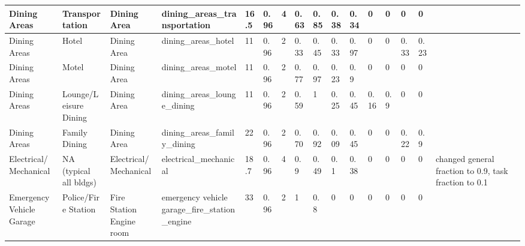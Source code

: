 \begin{center}
\begin{landscape}
\begin{longtable}{|p{0.75in}|p{0.75in}|p{0.75in}|p{0.75in}|p{0.3in}|p{0.3in}|p{0.3in}|p{0.3in}|p{0.3in}|p{0.3in}|p{0.3in}|p{0.3in}|p{0.3in}|p{0.3in}|p{0.3in}|p{0.6in}|}
      Dining Areas                            & Transportation              & Dining Area                                     & dining\_areas\_transportation                                   & 16.5 & 0.96 & 4  & 0.63   & 0.85  & 0.38  & 0.34  & 0    & 0    & 0    & 0    &                                                                                       \\ \hline
      Dining Areas                            & Hotel                       & Dining Area                                     & dining\_areas\_hotel                                            & 11   & 0.96 & 2  & 0.33   & 0.45  & 0.33  & 0.97  & 0    & 0    & 0.33 & 0.23 &                                                                                       \\ \hline
      Dining Areas                            & Motel                       & Dining Area                                     & dining\_areas\_motel                                            & 11   & 0.96 & 2  & 0.77   & 0.97  & 0.23  & 0.9   & 0    & 0    & 0    & 0    &                                                                                       \\ \hline
      Dining Areas                            & Lounge/Leisure Dining       & Dining Area                                     & dining\_areas\_lounge\_dining                                   & 11   & 0.96 & 2  & 0.59   & 1     & 0.25  & 0.45  & 0.16 & 0.9  & 0    & 0    &                                                                                       \\ \hline
      Dining Areas                            & Family Dining               & Dining Area                                     & dining\_areas\_family\_dining                                   & 22   & 0.96 & 2  & 0.70   & 0.92  & 0.09  & 0.45  & 0    & 0    & 0.22 & 0.9  &                                                                                       \\ \hline
      Electrical/Mechanical                 & NA (typical all bldgs)      & Electrical/Mechanical                           & electrical\_mechanical                                          & 18.7 & 0.96 & 4  & 0.9    & 0.49  & 0.1   & 0.38  & 0    & 0    & 0    & 0    & changed general fraction to 0.9, task fraction to 0.1                                 \\ \hline
      Emergency Vehicle Garage                & Police/Fire Station         & Fire Station Engine room                        & emergency vehicle garage\_fire\_station\_engine                 & 33   & 0.96 & 2  & 1      & 0.8   & 0     & 0     & 0    & 0    & 0    & 0    &                                                                                       \\ \hline

\end{longtable}
\end{landscape}
\end{center}
